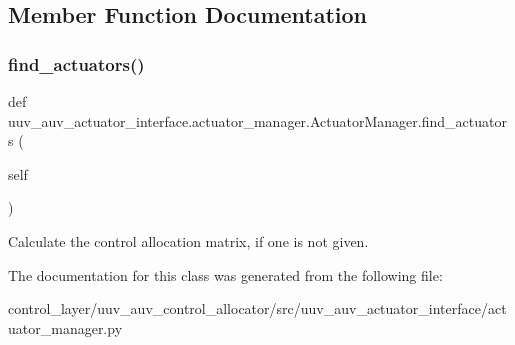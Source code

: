 \subsection{Member Function Documentation}
\mbox{\label{classuuv__auv__actuator__interface_1_1actuator__manager_1_1ActuatorManager_a1c8c06aa3e9a62acff2b4002f7b02dd2}} 
\subsubsection{\texorpdfstring{find\+\_\+actuators()}{find\_actuators()}}
{\footnotesize\ttfamily def uuv\+\_\+auv\+\_\+actuator\+\_\+interface.\+actuator\+\_\+manager.\+Actuator\+Manager.\+find\+\_\+actuators (\begin{DoxyParamCaption}\item[{}]{self }\end{DoxyParamCaption})}

\begin{DoxyVerb}Calculate the control allocation matrix, if one is not given.\end{DoxyVerb}
 

The documentation for this class was generated from the following file\+:\begin{DoxyCompactItemize}
\item 
control\+\_\+layer/uuv\+\_\+auv\+\_\+control\+\_\+allocator/src/uuv\+\_\+auv\+\_\+actuator\+\_\+interface/actuator\+\_\+manager.\+py\end{DoxyCompactItemize}
